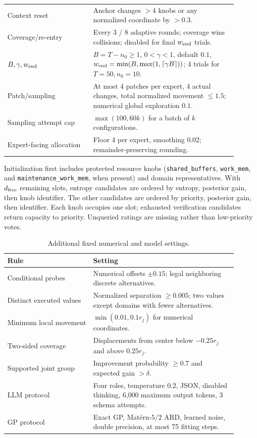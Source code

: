 \begin{table}[htbp]
\begin{tabular}{>{\raggedright\arraybackslash}p{0.34\linewidth}>{\raggedright\arraybackslash}p{0.58\linewidth}}
Context reset & Anchor changes $>4$ knobs or any normalized coordinate by $>0.3$. \\
Coverage/re-entry & Every 3 / 8 adaptive rounds; coverage wins collisions; disabled for final $w_{\rm end}$ trials.
\\
$B,\gamma,w_{\rm end}$ & $B=T-n_0\geq1$, $0<\gamma<1$, default $0.1$, $w_{\rm end}=\min(B,\max(1,\lceil\gamma B\rceil))$; 4 trials for $T=50,n_0=10$. \\
Patch/sampling & At most 4 patches per expert, 4 actual changes, total normalized movement $\leq1.5$; numerical global exploration $0.1$. \\
Sampling attempt cap & $\max(100,60k)$ for a batch of $k$ configurations. \\
Expert-facing allocation & Floor 4 per expert, smoothing $0.02$; remainder-preserving rounding. \\
\bottomrule
\end{tabular}
\end{table}

Initialization first includes protected resource knobs
(\texttt{shared\_buffers}, \texttt{work\_mem}, and
\texttt{maintenance\_work\_mem}, when present) and domain representatives.
With $d_{\rm free}$ remaining slots, entropy candidates are ordered by
entropy, posterior gain, then knob identifier. The other candidates are
ordered by priority, posterior gain, then identifier. Each knob occupies
one slot; exhausted verification candidates return capacity to priority.
Unqueried ratings are missing rather than low-priority votes.

\begin{table}[htbp]
\caption{Additional fixed numerical and model settings.}\label{tab:ct-settings-aux}
\centering\small
\begin{tabular}{>{\raggedright\arraybackslash}p{0.34\linewidth}>{\raggedright\arraybackslash}p{0.58\linewidth}}
\toprule
Rule & Setting \\
\midrule
Conditional probes & Numerical offsets $\pm0.15$; legal neighboring discrete alternatives. \\
Distinct executed values & Normalized separation $\geq0.005$; two values except domains with fewer alternatives. \\
Minimum local movement & $\min(0.01,0.1r_j)$ for numerical coordinates. \\
Two-sided coverage & Displacements from center below $-0.25r_j$ and above $0.25r_j$. \\
Supported joint group & Improvement probability $\geq0.7$ and expected gain $>\delta$. \\
LLM protocol & Four roles, temperature $0.2$, JSON, disabled thinking, 6,000 maximum output tokens, 3 schema attempts. \\
GP protocol & Exact GP, Mat\'ern-$5/2$ ARD, learned noise, double precision, at most 75 fitting steps. \\
\bottomrule
\end{tabular}
\end{table}


